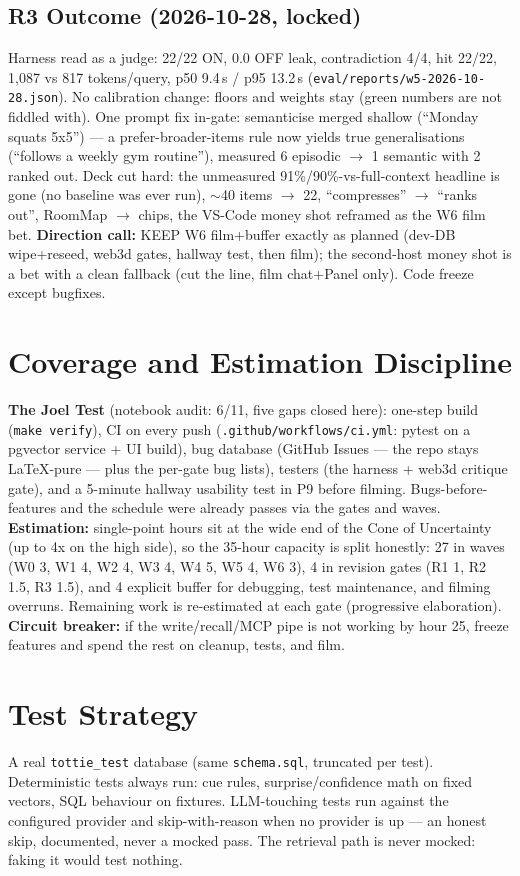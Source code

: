 \subsection{R3 Outcome (2026-10-28, locked)}
Harness read as a judge: 22/22 ON, 0.0 OFF leak, contradiction 4/4, hit 22/22,
1{,}087 vs 817 tokens/query, p50 9.4\,s / p95 13.2\,s
(\texttt{eval/reports/w5-2026-10-28.json}). No calibration change: floors and weights
stay (green numbers are not fiddled with). One prompt fix in-gate: semanticise merged
shallow (``Monday squats 5x5'') --- a prefer-broader-items rule now yields true
generalisations (``follows a weekly gym routine''), measured 6 episodic $\rightarrow$
1 semantic with 2 ranked out. Deck cut hard: the unmeasured 91\%/90\%-vs-full-context
headline is gone (no baseline was ever run), $\sim$40 items $\rightarrow$ 22, ``compresses''
$\rightarrow$ ``ranks out'', RoomMap $\rightarrow$ chips, the VS-Code money shot reframed as
the W6 film bet. \textbf{Direction call:} KEEP W6 film+buffer exactly as planned (dev-DB
wipe+reseed, web3d gates, hallway test, then film); the second-host money shot is a bet
with a clean fallback (cut the line, film chat+Panel only). Code freeze except bugfixes.

\section{Coverage and Estimation Discipline}
\textbf{The Joel Test} (notebook audit: 6/11, five gaps closed here): one-step build
(\texttt{make verify}), CI on every push (\texttt{.github/workflows/ci.yml}: pytest on a pgvector
service + UI build), bug database (GitHub Issues --- the repo stays LaTeX-pure --- plus the
per-gate bug lists), testers (the harness + web3d critique gate), and a 5-minute hallway usability
test in P9 before filming. Bugs-before-features and the schedule were already passes via the
gates and waves.
\textbf{Estimation:} single-point hours sit at the wide end of the Cone of Uncertainty (up to 4x
on the high side), so the 35-hour capacity is split honestly: 27 in waves (W0 3, W1 4, W2 4,
W3 4, W4 5, W5 4, W6 3), 4 in revision gates (R1 1, R2 1.5, R3 1.5), and 4 explicit buffer for
debugging, test maintenance, and filming overruns. Remaining work is re-estimated at each gate
(progressive elaboration). \textbf{Circuit breaker:} if the write/recall/MCP pipe is not working
by hour 25, freeze features and spend the rest on cleanup, tests, and film.

\section{Test Strategy}
A real \texttt{tottie\_test} database (same \texttt{schema.sql}, truncated per test).
Deterministic tests always run: cue rules, surprise/confidence math on fixed vectors, SQL
behaviour on fixtures. LLM-touching tests run against the configured provider and
skip-with-reason when no provider is up --- an honest skip, documented, never a mocked pass.
The retrieval path is never mocked: faking it would test nothing.

